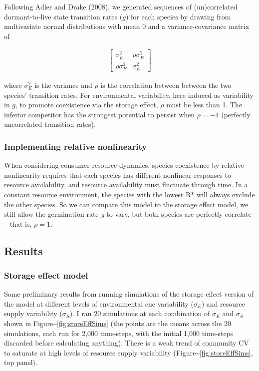 \documentclass[12pt,]{article}
\begin{document}
Following Adler and Drake (2008), we generated sequences of
(un)correlated dormant-to-live state transition rates (\(g\)) for each
species by drawing from multivariate normal distributions with mean 0
and a variance-covariance matrix of

\begin{align}
\begin{bmatrix}
\sigma^2_{E} & \rho\sigma^2_{E} \\
\rho\sigma^2_{E} & \sigma^2_{E}
\end{bmatrix}
\end{align}

\noindent{}where \(\sigma^2_{E}\) is the variance and \(\rho\) is the
correlation between between the two species' transition rates. For
environmental variability, here induced as variability in \(g\), to
promote coexistence via the storage effect, \(\rho\) must be less than
1. The inferior competitor has the strongest potential to persist when
\(\rho=-1\) (perfectly uncorrelated transition rates).

\subsubsection{Implementing relative
nonlinearity}\label{implementing-relative-nonlinearity}

When considering consumer-resource dynamics, species coexistence by
relative nonlinearity requires that each species has different nonlinear
responses to resource availability, and resource availability must
fluctuate through time. In a constant resource environment, the species
with the lowest R* will always exclude the other species. So we can
compare this model to the storage effect model, we still allow the
germination rate \emph{g} to vary, but both species are perfectly
correlate -- that is, \(\rho=1\).

\subsection{Results}\label{results}

\subsubsection{Storage effect model}\label{storage-effect-model}

Some preliminary results from running simulations of the storage effect
version of the model at different levels of environmental cue
variability (\(\sigma_{E}\)) and resource supply variability
(\(\sigma_{S}\)). I ran 20 simulations at each combination of
\(\sigma_{E}\) and \(\sigma_{S}\) shown in
Figure\textasciitilde{}\ref{fig:storeEffSims} (the points are the means
across the 20 simulations, each run for 2,000 time-steps, with the
initial 1,000 time-steps discarded before calculating anything). There
is a weak trend of community CV to saturate at high levels of resource
supply variability (Figure\textasciitilde{}\ref{fig:storeEffSims}, top
panel).
\end{document}

